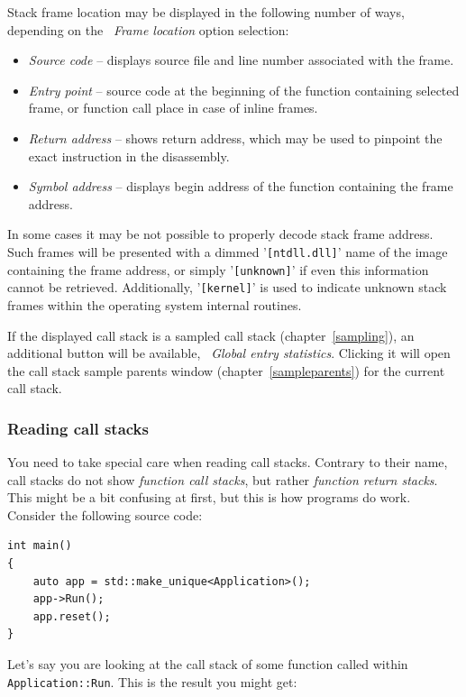 \documentclass[hidelinks,titlepage,a4paper]{article}
\begin{document}
Stack frame location may be displayed in the following number of ways, depending on the \emph{\faAt{}~Frame location} option selection:

\begin{itemize}
\item \emph{Source code} -- displays source file and line number associated with the frame.
\item \emph{Entry point} -- source code at the beginning of the function containing selected frame, or function call place in case of inline frames.
\item \emph{Return address} -- shows return address, which may be used to pinpoint the exact instruction in the disassembly.
\item \emph{Symbol address} -- displays begin address of the function containing the frame address.
\end{itemize}

In some cases it may be not possible to properly decode stack frame address. Such frames will be presented with a dimmed '\texttt{[ntdll.dll]}' name of the image containing the frame address, or simply '\texttt{[unknown]}' if even this information cannot be retrieved. Additionally, '\texttt{[kernel]}' is used to indicate unknown stack frames within the operating system internal routines.

If the displayed call stack is a sampled call stack (chapter~\ref{sampling}), an additional button will be available, \emph{\faDoorOpen{}~Global entry statistics}. Clicking it will open the call stack sample parents window (chapter~\ref{sampleparents}) for the current call stack.

\subsubsection{Reading call stacks}
\label{readingcallstacks}

You need to take special care when reading call stacks. Contrary to their name, call stacks do not show \emph{function call stacks}, but rather \emph{function return stacks}. This might be a bit confusing at first, but this is how programs do work. Consider the following source code:

\begin{lstlisting}
int main()
{
    auto app = std::make_unique<Application>();
    app->Run();
    app.reset();
}
\end{lstlisting}

Let's say you are looking at the call stack of some function called within \texttt{Application::Run}. This is the result you might get:
\end{document}
